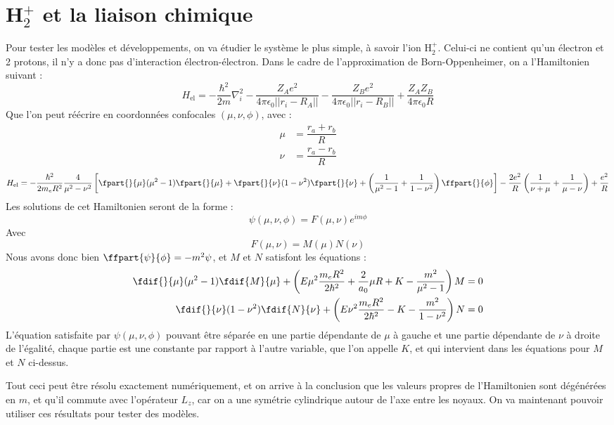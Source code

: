 \section{\textnormal{H}$_2^+$ et la liaison chimique}


Pour tester les modèles et développements, on va étudier le système le plus simple, à savoir l'ion H$_2^+$. Celui-ci ne contient qu'un électron et 2 protons, il n'y a donc pas d'interaction électron-électron. Dans le cadre de l'approximation de Born-Oppenheimer, on a l'Hamiltonien suivant :
\[
H_\text{el} = -\dfrac{\hbar^2}{2m}\nabla^2_i-\dfrac{Z_Ae^2}{4\pi \epsilon_0||r_i - R_A||}-\dfrac{Z_Be^2}{4\pi \epsilon_0||r_i - R_B||} +\dfrac{Z_AZ_B}{4\pi\epsilon_0R}
\]
Que l'on peut réécrire en coordonnées confocales $(\mu, \nu, \phi)$, avec :
\begin{align*}
    \mu &= \dfrac{r_a + r_b}{R}\\
    \nu &= \dfrac{r_a-r_b}{R}
\end{align*}
\[
H_\text{el} = -\dfrac{\hbar^2}{2m_eR^2}\dfrac{4}{\mu^2-\nu^2}\left[\fpart{}{\mu}(\mu^2-1)\fpart{}{\mu}+\fpart{}{\nu}(1-\nu^2)\fpart{}{\nu}+\left(\dfrac{1}{\mu^2-1}+\dfrac{1}{1-\nu^2}\right)\ffpart{}{\phi}\right] - \dfrac{2e^2}{R}\left(\dfrac{1}{\nu + \mu}+\dfrac{1}{\mu-\nu}\right) + \dfrac{e^2}{R}
\]
Les solutions de cet Hamiltonien seront de la forme :
\[
\psi(\mu,\nu,\phi) = F(\mu,\nu)e^{im\phi}
\]
Avec
\[
F(\mu,\nu) = M(\mu)N(\nu)
\]
Nous avons donc bien $\ffpart{\psi}{\phi} = -m^2\psi$, et $M$ et $N$ satisfont les équations :
\begin{align*}
    \fdif{}{\mu}(\mu^2-1)\fdif{M}{\mu} + \left(E\mu^2\dfrac{m_eR^2}{2\hbar^2}+\dfrac{2}{a_0}\mu R+K-\dfrac{m^2}{\mu^2-1}\right)M &= 0\\
    \fdif{}{\nu}(1-\nu^2)\fdif{N}{\nu} + \left(E\nu^2\dfrac{m_eR^2}{2\hbar^2}-K-\dfrac{m^2}{1-\nu^2}\right)N &= 0
\end{align*}
L'équation satisfaite par $\psi(\mu,\nu,\phi)$ pouvant être séparée en une partie dépendante de $\mu$ à gauche et une partie dépendante de $\nu$ à droite de l'égalité, chaque partie est une constante par rapport à l'autre variable, que l'on appelle $K$, et qui intervient dans les équations pour $M$ et $N$ ci-dessus.


Tout ceci peut être résolu exactement numériquement, et on arrive à la conclusion que les valeurs propres de l'Hamiltonien sont dégénérées en $m$, et qu'il commute avec l'opérateur $L_z$, car on a une symétrie cylindrique autour de l'axe entre les noyaux. On va maintenant pouvoir utiliser ces résultats pour tester des modèles.


